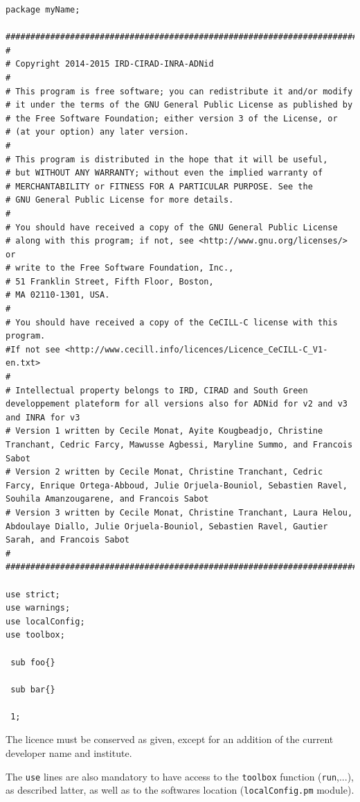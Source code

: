 \documentclass[a4paper,10pt]{report}
\begin{document}
\begin{lstlisting}
package myName;

################################################################################################################################
#
# Copyright 2014-2015 IRD-CIRAD-INRA-ADNid
#
# This program is free software; you can redistribute it and/or modify
# it under the terms of the GNU General Public License as published by
# the Free Software Foundation; either version 3 of the License, or
# (at your option) any later version.
#
# This program is distributed in the hope that it will be useful,
# but WITHOUT ANY WARRANTY; without even the implied warranty of
# MERCHANTABILITY or FITNESS FOR A PARTICULAR PURPOSE. See the
# GNU General Public License for more details.
#
# You should have received a copy of the GNU General Public License
# along with this program; if not, see <http://www.gnu.org/licenses/> or
# write to the Free Software Foundation, Inc.,
# 51 Franklin Street, Fifth Floor, Boston,
# MA 02110-1301, USA.
#
# You should have received a copy of the CeCILL-C license with this program.
#If not see <http://www.cecill.info/licences/Licence_CeCILL-C_V1-en.txt>
#
# Intellectual property belongs to IRD, CIRAD and South Green developpement plateform for all versions also for ADNid for v2 and v3 and INRA for v3
# Version 1 written by Cecile Monat, Ayite Kougbeadjo, Christine Tranchant, Cedric Farcy, Mawusse Agbessi, Maryline Summo, and Francois Sabot
# Version 2 written by Cecile Monat, Christine Tranchant, Cedric Farcy, Enrique Ortega-Abboud, Julie Orjuela-Bouniol, Sebastien Ravel, Souhila Amanzougarene, and Francois Sabot
# Version 3 written by Cecile Monat, Christine Tranchant, Laura Helou, Abdoulaye Diallo, Julie Orjuela-Bouniol, Sebastien Ravel, Gautier Sarah, and Francois Sabot
#
################################################################################################################################

use strict;
use warnings;
use localConfig;
use toolbox;

 sub foo{}

 sub bar{}
 
 1;
 \end{lstlisting}

The licence must be conserved as given, except for an addition of the current developer name and institute.

The \texttt{use} lines are also mandatory to have access to the \texttt{toolbox} function (\texttt{run},...), as described latter, as well as to the softwares location (\texttt{localConfig.pm} module).
\end{document}
